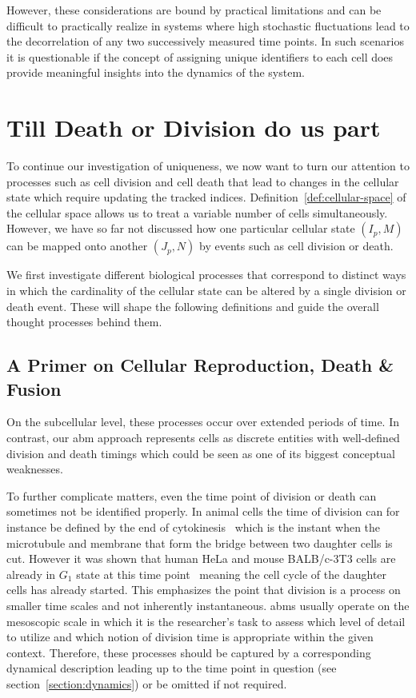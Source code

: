 However, these considerations are bound by practical limitations and can be difficult
to practically realize in systems where high stochastic fluctuations lead to the decorrelation of
any two successively measured time points.
In such scenarios it is questionable if the concept of assigning unique identifiers to each cell
does provide meaningful insights into the dynamics of the system.

\section{Till Death or Division do us part}
To continue our investigation of uniqueness, we now want to turn our attention to processes such as
cell division and cell death that lead to changes in the cellular state which require updating the
tracked indices.
Definition~\ref{def:cellular-space} of the cellular space allows us to treat a variable number of
cells simultaneously.
However, we have so far not discussed how one particular cellular state $(I_p,M)$ can be mapped onto
another $(J_p,N)$ by events such as cell division or death.

We first investigate different biological processes that correspond to distinct ways in which the
cardinality of the cellular state can be altered by a single division or death event.
These will shape the following definitions and guide the overall thought processes behind them.

\subsection{A Primer on Cellular Reproduction, Death \& Fusion}
\label{subsec:a-primer-on-cellular-processes}
On the subcellular level, these processes occur over extended periods of time.
In contrast, our \ac{abm} approach represents cells as discrete entities with well-defined division
and death timings which could be seen as one of its biggest conceptual weaknesses.

To further complicate matters, even the time point of division or death can sometimes not be
identified properly.
In animal cells the time of division can for instance be defined by the end of
cytokinesis~\cite{Gershony2014} which is the instant when the microtubule and membrane that form
the bridge between two daughter cells is cut.
However it was shown that human HeLa and mouse BALB/c-3T3 cells are already in $G_1$ state at this
time point~\cite{Gershony2014} meaning the cell cycle of the daughter cells has already started.
This emphasizes the point that division is a process on smaller time scales and not inherently
instantaneous.
\acp{abm} usually operate on the mesoscopic scale in which it is the researcher's task to assess
which level of detail to utilize and which notion of division time is appropriate within the given
context.
Therefore, these processes should be captured by a corresponding dynamical description leading up to
the time point in question (see section~\ref{section:dynamics}) or be omitted if not required.

